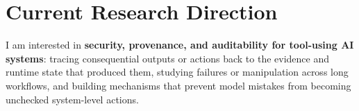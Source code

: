 \documentclass[10pt,a4paper]{article}
\begin{document}
\section{Current Research Direction}
I am interested in \textbf{security, provenance, and auditability for tool-using AI systems}: tracing consequential outputs or actions back to the evidence and runtime state that produced them, studying failures or manipulation across long workflows, and building mechanisms that prevent model mistakes from becoming unchecked system-level actions.
\end{document}
